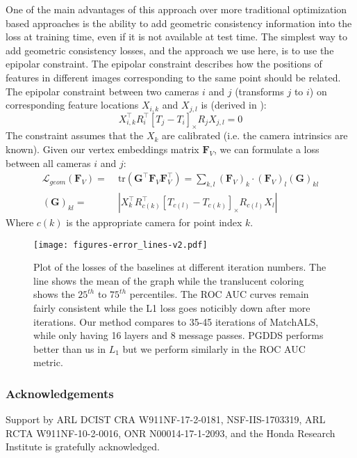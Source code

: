 \documentclass[10pt,twocolumn,letterpaper]{article}
\newcommand{\mat}[1]{\mathbf{#1}}
\newcommand{\cross}[1]{[#1]_{\times}}
\begin{document}
One of the main advantages of this approach over more traditional optimization based approaches is the ability to add geometric consistency information into the loss at training time, even if it is not available at test time.
The simplest way to add geometric consistency losses, and the approach we use here, is to use the epipolar constraint.
The epipolar constraint describes how the positions of features in different images corresponding to the same point should be related.
The epipolar constraint between two cameras $i$ and $j$  (transforms $j$ to $i$) on corresponding feature locations $X_{i,k}$ and $X_{j,l}$ is (derived in \cite{tron2014quotient}):
\begin{equation}
X_{i,k}^\top R_{i}^\top \cross{T_{j} - T_{i}}R_{j} X_{j,l} = 0
\label{eq:essential_constraint}
\end{equation}
The constraint assumes that the $X_k$ are calibrated (i.e. the camera intrinsics are known). 
Given our vertex embeddings matrix $\mat{F}_V$, we can formulate a loss between all cameras $i$ and $j$:
\begin{align} 
\mathcal{L}_{geom}(\mat{F}_V)
=&\; \mathrm{tr}(\mat{G}^\top \mat{F}_V\mat{F}_V^\top) = \sum_{k,l} (\mat{F}_V)_{k} \cdot (\mat{F}_V)_{l} (\mat{G})_{kl} \label{eq:geom_cost2} \\
(\mat{G})_{kl} =&\; \left|X_{k}^\top R_{c(k)}^\top \cross{T_{c(l)} - T_{c(k)}}R_{c(l)} X_{l}\right| \nonumber
\end{align}
Where $c(k)$ is the appropriate camera for point index $k$.




\begin{figure*}[t]
\begin{center}
  \texttt{[image: figures-error\_lines-v2.pdf]}
  \end{center}
     \caption{
         Plot of the losses of the baselines at different iteration numbers.
         The line shows the mean of the graph while the translucent coloring shows the $25^{th}$ to $75^{th}$ percentiles.
         The ROC AUC curves remain fairly consistent while the L1 loss goes noticibly down after more iterations.
         Our method compares to 35-45 iterations of MatchALS, while only having 16 layers and 8 message passes.
         PGDDS performs better than us in $L_1$ but we perform similarly in the ROC AUC metric.
     }
  \label{fig:errorlines}
\end{figure*}


\subsubsection*{Acknowledgements}
Support by ARL DCIST CRA W911NF-17-2-0181, NSF-IIS-1703319, ARL RCTA W911NF-10-2-0016, ONR N00014-17-1-2093, and the Honda Research Institute is gratefully acknowledged.

{\small


}
\end{document}

